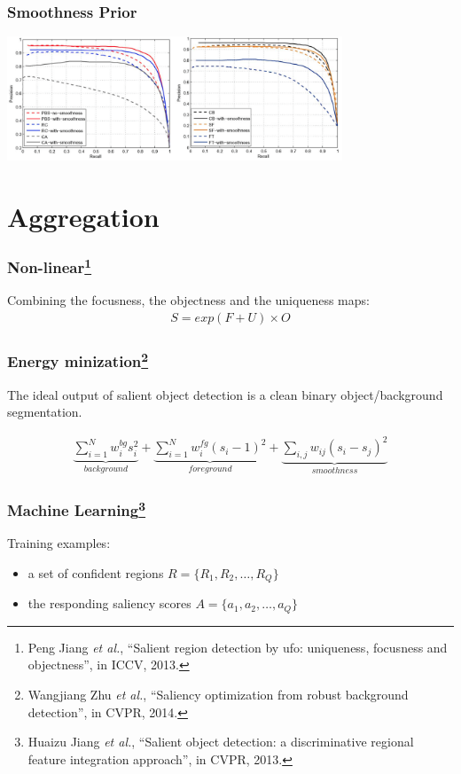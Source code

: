 \documentclass[notheorems,serif,table,compress]{beamer}  %
\begin{document}
\begin{frame}
\frametitle{ Smoothness Prior}
\centering\includegraphics[width=10cm]{smoothness}
\end{frame}




\section{Aggregation}

\begin{frame}
\frametitle{ Non-linear\footnote{Peng Jiang \textit{et al.}, ``Salient region detection by ufo: uniqueness, focusness and objectness'', in ICCV, 2013. }}
Combining the focusness, the objectness and the uniqueness maps:
\begin{align}
S = exp( F + U) \times O
\end{align}
\end{frame}

\begin{frame}
\frametitle{ Energy minization\footnote{Wangjiang Zhu \textit{et al.}, ``Saliency optimization from robust background detection'', in CVPR, 2014.}}
The ideal output of salient object detection is a clean binary object/background segmentation.

\begin{align}
\underbrace{\sum_{i=1}^{N}w_i^{bg}s_i^2}_{background}+\underbrace{\sum_{i=1}^{N}w_i^{fg}(s_i-1)^2}_{foreground}+\underbrace{\sum_{i, j}w_{ij}(s_i-s_j)^2}_{smoothness}
\end{align}
\end{frame}


\begin{frame}
\frametitle{ Machine Learning\footnote{Huaizu Jiang \textit{et al.}, ``Salient object detection: a discriminative regional feature integration approach'', in CVPR, 2013.}}
Training examples: 
\begin{itemize}
\item a set of confident regions $R = \{ R_1, R_2, \ldots, R_Q\}$
\item the responding saliency scores $A = \{a_1, a_2, \ldots, a_Q\}$
\end{itemize}
\end{frame}
\end{document}

